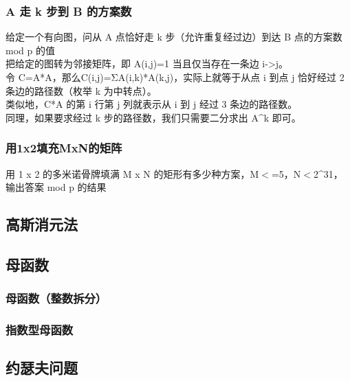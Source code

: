 \documentclass[a4paper]{article}
\begin{document}
\begin{CJK*}{UTF8}{gbsn}
\begin{multicols}{3}
\begin{flushleft}
\subsubsection{A 走 k 步到 B 的方案数}
给定一个有向图，问从 A 点恰好走 k 步（允许重复经过边）到达 B 点的方案数 mod p 的值\\
把给定的图转为邻接矩阵，即 A(i,j)=1 当且仅当存在一条边 i->j。\\
令 C=A*A，那么C(i,j)=ΣA(i,k)*A(k,j)，实际上就等于从点 i 到点 j 恰好经过 2 条边的路径数（枚举 k 为中转点）。\\
类似地，C*A 的第 i 行第 j 列就表示从 i 到 j 经过 3 条边的路径数。\\
同理，如果要求经过 k 步的路径数，我们只需要二分求出 A\^{}k 即可。\\

\subsubsection{用1x2填充MxN的矩阵}
用 1 x 2 的多米诺骨牌填满 M x N 的矩形有多少种方案，M$<$=5，N$<$2\^{}31，输出答案 mod p 的结果\\

\subsection{高斯消元法}


\subsection{母函数}
\subsubsection{母函数（整数拆分）}


\subsubsection{指数型母函数}


\subsection{约瑟夫问题}



\end{flushleft}
\end{multicols}
\end{CJK*}
\end{document}
